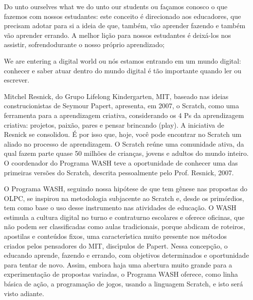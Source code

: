 \documentclass[
12pt,		%
openright,	%
twoside,  %
a4paper,			%
chapter=TITLE,		%
english,			%
french,				%
spanish,			%
brazil				%
]{USPSC-classe/USPSC}
\begin{document}
\begin{alineas}
\item Do unto ourselves what we do unto our students ou \textquotedbl fa\c{c}amos conosco o que fazemos com nossos estudantes\textquotedbl : este conceito \'e direcionado aos educadores, que precisam adotar para si a ideia de que, tamb\'em, v\~ao aprender fazendo e tamb\'em v\~ao aprender errando. A melhor li\c{c}\~ao para nossos estudantes \'e deix\'a-los nos assistir, \textquotedbl sofrendo\textquotedbl  durante o nosso pr\'oprio aprendizado;
\item We are entering a digital world ou \textquotedbl n\'os estamos entrando em um mundo digital\textquotedbl : conhecer e saber atuar dentro do mundo digital \'e t\~ao importante quando ler ou escrever.
\end{alineas}

Mitchel Resnick, do Grupo Lifelong Kindergarten, MIT, baseado nas ideias construcionistas de Seymour Papert, apresenta, em 2007, o Scratch, como uma ferramenta para a aprendizagem criativa, considerando os 4 Ps da aprendizagem criativa: projetos, paix\~ao, pares e pensar brincando (play). A iniciativa de Resnick se consolidou. \'E por isso que, hoje, voc\^e pode encontrar no Scratch um aliado no processo de aprendizagem. O Scratch re\'une uma comunidade ativa, da qual fazem parte quase 50 milh\~oes de crian\c{c}as, jovens e adultos do mundo inteiro. O coordenador do Programa WASH teve a oportunidade de conhecer uma das primeiras vers\~oes do Scratch, descrita pessoalmente pelo Prof. Resnick, 2007.








O Programa WASH, seguindo nossa hip\'otese de que tem g\^enese nas propostas do OLPC, se inspirou na metodologia subjacente ao Scratch e, desde os prim\'ordios, tem como base o uso desse instrumento nas atividades de educa\c{c}\~ao. O WASH estimula a cultura digital no turno e contraturno escolares e oferece oficinas, que n\~ao podem ser classificadas como aulas tradicionais, porque abdicam de roteiros, apostilas e conte\'udos fixos, uma caracter\'{\i}stica muito presente nos m\'etodos criados pelos pensadores do MIT, disc\'{\i}pulos de Papert. Nessa concep\c{c}\~ao, o educando aprende, fazendo e errando, com objetivos determinados e oportunidade para tentar de novo. Assim, embora haja uma abertura muito grande para a experimenta\c{c}\~ao de propostas variadas, o Programa WASH oferece, como linha b\'asica de a\c{c}\~ao, a programa\c{c}\~ao de jogos, usando a linguagem Scratch, e isto ser\'a visto adiante.
\end{document}
